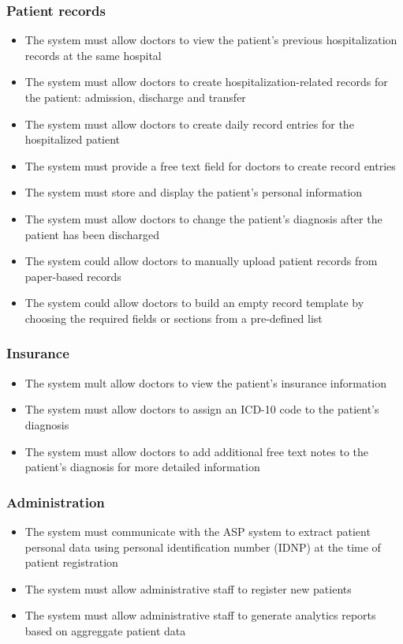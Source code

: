 \subsubsection{Patient records}
\begin{itemize}
    \item The system must allow doctors to view the patient's previous hospitalization records at the same hospital
    \item The system must allow doctors to create hospitalization-related records for the patient: admission, discharge and transfer
    \item The system must allow doctors to create daily record entries for the hospitalized patient
    \item The system must provide a free text field for doctors to create record entries 
    \item The system must store and display the patient's personal information
    \item The system must allow doctors to change the patient's diagnosis after the patient has been discharged
    \item The system could allow doctors to manually upload patient records from paper-based records
    \item The system could allow doctors to build an empty record template by choosing the required fields or sections from a pre-defined list
\end{itemize}

\subsubsection{Insurance}
\begin{itemize}
    \item The system mult allow doctors to view the patient's insurance information
    \item The system must allow doctors to assign an ICD-10 code to the patient's diagnosis
    \item The system must allow doctors to add additional free text notes to the patient's diagnosis for more detailed information
\end{itemize}

\subsubsection{Administration}

\begin{itemize}
    \item The system must communicate with the ASP system to extract patient personal data using personal identification number (IDNP) at the time of patient registration
    \item The system must allow administrative staff to register new patients
    \item The system must allow administrative staff to generate analytics reports based on aggreggate patient data
\end{itemize}

